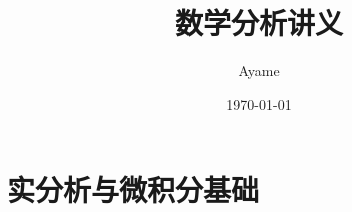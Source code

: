 \documentclass[cn,12pt,math=newtx,citestyle=gb7714-2015,bibstyle=gb7714-2015]{elegantbook}
\title{数学分析讲义}
\author{Ayame}
\date{\today}
\begin{document}
    \maketitle
    \frontmatter

    
    

    \tableofcontents
    \mainmatter
    \newpage

    \part{实分析与微积分基础}
    
    
    
    
    
\end{document}
